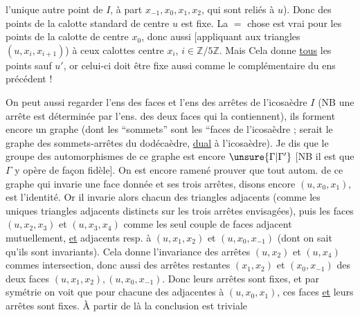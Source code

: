 l'unique autre point de $I$, à part $x_{-1},x_0,x_1,x_2$, qui sont reliés à $u$). Donc   des points  de la calotte standard  de centre $u$ est fixe. La $=$ chose est vrai pour les points de la calotte de centre $x_0$, donc aussi [appliquant  aux triangles $(u,x_i,x_{i+1})$) à ceux  calottes  centre $x_i$, $i\in\mathbb Z/5\mathbb Z$. Mais Cela donne \uline{tous} les points  sauf $u'$, or celui-ci doit être fixe aussi comme le complémentaire du  ens précédent !

 On peut aussi regarder l'ens des faces et l'ens des arrêtes de l'icosaèdre $I$  (NB une arrête est déterminée par l'ens. des deux faces qui la contiennent), ils forment encore un graphe (dont les ``sommets'' sont les ``faces de l'icosaèdre ;   serait le graphe des sommets-arrêtes du dodécaèdre, \uline{dual} à l'icosaèdre). Je dis que le groupe des automorphismes de ce graphe est encore $\unsure{\Gamma|\Gamma'}$ [NB il est   que $\Gamma$ y opère de façon fidèle]. On est encore ramené  prouver que tout autom. de ce graphe qui  invarie une face donnée et ses trois arrêtes, disons  encore $(u,x_0,x_1)$, est l'identité. Or il invarie alors chacun des  triangles adjacents (comme les uniques triangles adjacents distincts sur les trois arrêtes envisagées),  puis les  faces $(u,x_2,x_3)$ et $(u,x_3,x_4)$ comme les seul couple de faces adjacent mutuellement, \uline{et} adjacents resp. à $(u,x_1,x_2)$ et $(u,x_0,x_{-1})$ (dont on sait qu'ils sont invariants). Cela donne l'invariance des  arrêtes $(u,x_2)$ et $(u,x_4)$ commes intersection, donc aussi des arrêtes restantes $(x_1,x_2)$ et $(x_0,x_{-1})$ des deux  faces $(u,x_1,x_2),(u,x_0,x_{-1})$. Donc leurs arrêtes sont fixes,  et par symétrie on voit que pour chacune des   adjacentes à $(u,x_0,x_1)$,  ces faces \uline{et} leurs arrêtes sont fixes. À partir de là la conclusion est triviale
